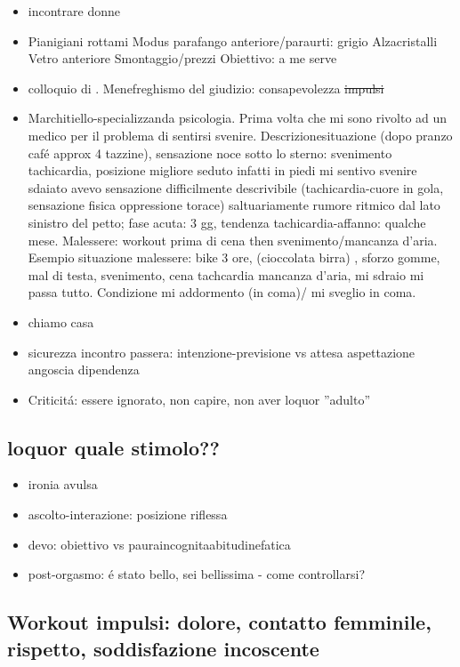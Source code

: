 \begin{itemize}
\item incontrare donne
\item Pianigiani rottami
Modus parafango anteriore/paraurti: grigio
Alzacristalli
Vetro anteriore
Smontaggio/prezzi
Obiettivo: a me serve
\item colloquio di .
Menefreghismo del giudizio: consapevolezza \sout{impulsi}
\item Marchitiello-specializzanda psicologia.
Prima volta che mi sono rivolto ad un medico per il problema di sentirsi svenire. Descrizionesituazione (dopo pranzo caf\'e approx 4 tazzine), sensazione noce sotto lo sterno: svenimento tachicardia, posizione migliore seduto infatti in piedi mi sentivo svenire sdaiato avevo sensazione difficilmente descrivibile (tachicardia-cuore in gola, sensazione fisica oppressione torace) saltuariamente rumore ritmico dal lato sinistro del petto; fase acuta: 3 gg, tendenza tachicardia-affanno: qualche mese.
Malessere: workout prima di cena then svenimento/mancanza d'aria.
Esempio situazione malessere: bike 3 ore, (cioccolata birra) , sforzo gomme, mal di testa, svenimento, cena tachcardia mancanza d'aria, mi sdraio mi passa tutto.
Condizione mi addormento (in coma)/ mi sveglio in coma.
\item chiamo casa
\item sicurezza incontro passera: intenzione-previsione vs attesa aspettazione angoscia dipendenza
\item Criticit\'a: essere ignorato, non capire, non aver loquor ''adulto''
\end{itemize}

\subsection{loquor quale stimolo??}

\begin{itemize}
\item ironia avulsa
\item ascolto-interazione: posizione riflessa
\item devo: obiettivo vs pauraincognitaabitudinefatica
\item post-orgasmo: \'e stato bello, sei bellissima - come controllarsi?
\end{itemize}

\subsection{Workout impulsi: dolore, contatto femminile, rispetto, soddisfazione incoscente}

